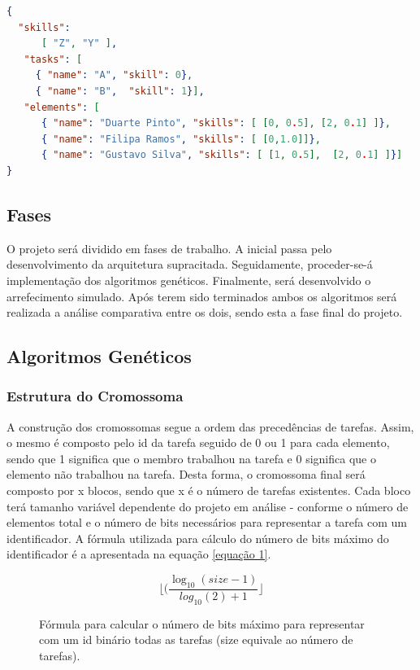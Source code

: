 \begin{titlepage}
\begin{lstlisting}[language=json,firstnumber=1]
{ 
  "skills": 
      [ "Z", "Y" ], 
   "tasks": [
     { "name": "A", "skill": 0},
     { "name": "B",  "skill": 1}],
   "elements": [
      { "name": "Duarte Pinto", "skills": [ [0, 0.5], [2, 0.1] ]},
      { "name": "Filipa Ramos", "skills": [ [0,1.0]]},
      { "name": "Gustavo Silva", "skills": [ [1, 0.5],  [2, 0.1] ]}]
}
\end{lstlisting}

\subsection{Fases}
\justify\normalsize 
O projeto será dividido em fases de trabalho. A inicial passa pelo desenvolvimento da arquitetura supracitada. Seguidamente, proceder-se-á implementação dos algoritmos genéticos. Finalmente, será desenvolvido o arrefecimento simulado. Após terem sido terminados ambos os algoritmos será realizada a análise comparativa entre os dois, sendo esta a fase final do projeto.


\subsection{Algoritmos Genéticos}

\subsubsection{Estrutura do Cromossoma}
\justify\normalsize
A construção dos cromossomas segue a ordem das precedências de tarefas. Assim, o mesmo é composto pelo id da tarefa seguido de 0 ou 1 para cada elemento, sendo que 1 significa que o membro trabalhou na tarefa e 0 significa que o elemento não trabalhou na tarefa. Desta forma, o cromossoma final será composto por x blocos, sendo que x é o número de tarefas existentes. Cada bloco terá tamanho variável dependente do projeto em análise - conforme o número de elementos total e o número de bits necessários para representar a tarefa com um identificador. A fórmula utilizada para cálculo do número de bits máximo do identificador é a apresentada na equação \ref{equação 1}.

\begin{figure}[!ht]
\begin{equation} \label{equação 1}
\lfloor (\dfrac{\log_{10}(size-1)}{log_{10}(2)+1} \rfloor
\end{equation}
\caption{Fórmula para calcular o número de bits máximo para representar com um id binário todas as tarefas (size equivale ao número de tarefas).}
\end{figure}


\end{titlepage}
